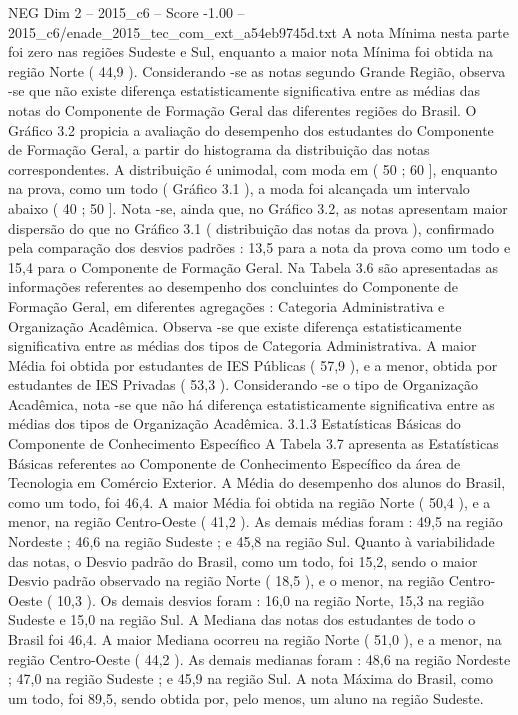 \begin{textsample}{NEG Dim 2 – 2015\_c6 – Score -1.00 – 2015\_c6/enade\_2015\_tec\_com\_ext\_a54eb9745d.txt}
A nota Mínima nesta parte foi zero nas regiões Sudeste e Sul, enquanto a maior nota Mínima foi obtida na região Norte ( 44,9 ).
Considerando -se as notas segundo Grande Região, observa -se que não existe diferença estatisticamente significativa entre as médias das notas do Componente de Formação Geral das diferentes regiões do Brasil.
O Gráfico 3.2 propicia a avaliação do desempenho dos estudantes do Componente de Formação Geral, a partir do histograma da distribuição das notas correspondentes.
A distribuição é unimodal, com moda em ( 50 ; 60 ], enquanto na prova, como um todo ( Gráfico 3.1 ), a moda foi alcançada um intervalo abaixo ( 40 ; 50 ].
Nota -se, ainda que, no Gráfico 3.2, as notas apresentam maior dispersão do que no Gráfico 3.1 ( distribuição das notas da prova ), confirmado pela comparação dos desvios padrões : 13,5 para a nota da prova como um todo e 15,4 para o Componente de Formação Geral.
Na Tabela 3.6 são apresentadas as informações referentes ao desempenho dos concluintes do Componente de Formação Geral, em diferentes agregações : Categoria Administrativa e Organização Acadêmica.
Observa -se que existe diferença estatisticamente significativa entre as médias dos tipos de Categoria Administrativa.
A maior Média foi obtida por estudantes de IES Públicas ( 57,9 ), e a menor, obtida por estudantes de IES Privadas ( 53,3 ).
Considerando -se o tipo de Organização Acadêmica, nota -se que não há diferença estatisticamente significativa entre as médias dos tipos de Organização Acadêmica. 3.1.3 Estatísticas Básicas do Componente de Conhecimento Específico A Tabela 3.7 apresenta as Estatísticas Básicas referentes ao Componente de Conhecimento Específico da área de Tecnologia em Comércio Exterior.
A Média do desempenho dos alunos do Brasil, como um todo, foi 46,4.
A maior Média foi obtida na região Norte ( 50,4 ), e a menor, na região Centro-Oeste ( 41,2 ).
As demais médias foram : 49,5 na região Nordeste ; 46,6 na região Sudeste ; e 45,8 na região Sul.
Quanto à variabilidade das notas, o Desvio padrão do Brasil, como um todo, foi 15,2, sendo o maior Desvio padrão observado na região Norte ( 18,5 ), e o menor, na região Centro-Oeste ( 10,3 ).
Os demais desvios foram : 16,0 na região Norte, 15,3 na região Sudeste e 15,0 na região Sul.
A Mediana das notas dos estudantes de todo o Brasil foi 46,4.
A maior Mediana ocorreu na região Norte ( 51,0 ), e a menor, na região Centro-Oeste ( 44,2 ).
As demais medianas foram : 48,6 na região Nordeste ; 47,0 na região Sudeste ; e 45,9 na região Sul.
A nota Máxima do Brasil, como um todo, foi 89,5, sendo obtida por, pelo menos, um aluno na região Sudeste.

\end{textsample}
